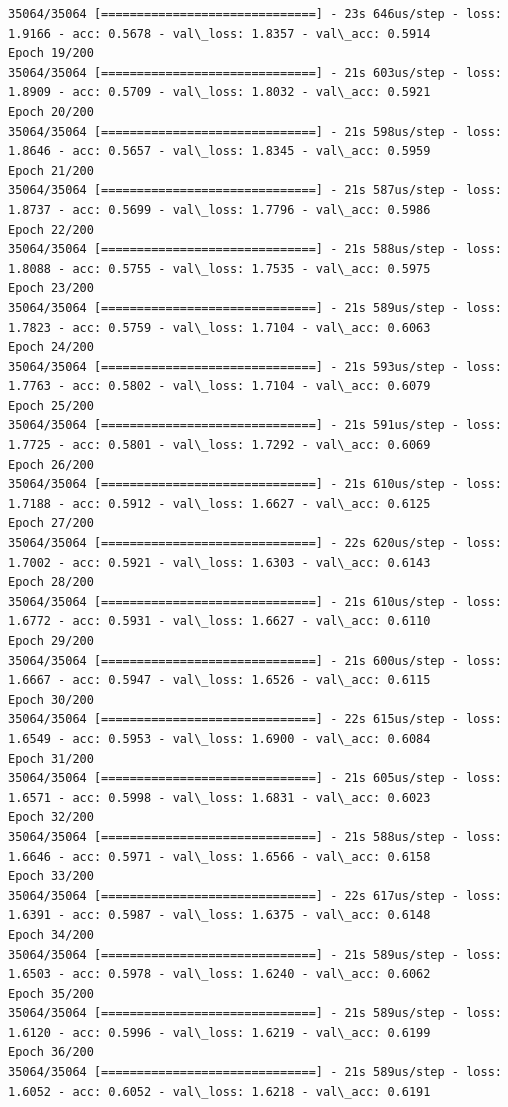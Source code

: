 \documentclass[11pt]{article}
\begin{document}
\begin{Verbatim}[commandchars=\\\{\}]
35064/35064 [==============================] - 23s 646us/step - loss: 1.9166 - acc: 0.5678 - val\_loss: 1.8357 - val\_acc: 0.5914
Epoch 19/200
35064/35064 [==============================] - 21s 603us/step - loss: 1.8909 - acc: 0.5709 - val\_loss: 1.8032 - val\_acc: 0.5921
Epoch 20/200
35064/35064 [==============================] - 21s 598us/step - loss: 1.8646 - acc: 0.5657 - val\_loss: 1.8345 - val\_acc: 0.5959
Epoch 21/200
35064/35064 [==============================] - 21s 587us/step - loss: 1.8737 - acc: 0.5699 - val\_loss: 1.7796 - val\_acc: 0.5986
Epoch 22/200
35064/35064 [==============================] - 21s 588us/step - loss: 1.8088 - acc: 0.5755 - val\_loss: 1.7535 - val\_acc: 0.5975
Epoch 23/200
35064/35064 [==============================] - 21s 589us/step - loss: 1.7823 - acc: 0.5759 - val\_loss: 1.7104 - val\_acc: 0.6063
Epoch 24/200
35064/35064 [==============================] - 21s 593us/step - loss: 1.7763 - acc: 0.5802 - val\_loss: 1.7104 - val\_acc: 0.6079
Epoch 25/200
35064/35064 [==============================] - 21s 591us/step - loss: 1.7725 - acc: 0.5801 - val\_loss: 1.7292 - val\_acc: 0.6069
Epoch 26/200
35064/35064 [==============================] - 21s 610us/step - loss: 1.7188 - acc: 0.5912 - val\_loss: 1.6627 - val\_acc: 0.6125
Epoch 27/200
35064/35064 [==============================] - 22s 620us/step - loss: 1.7002 - acc: 0.5921 - val\_loss: 1.6303 - val\_acc: 0.6143
Epoch 28/200
35064/35064 [==============================] - 21s 610us/step - loss: 1.6772 - acc: 0.5931 - val\_loss: 1.6627 - val\_acc: 0.6110
Epoch 29/200
35064/35064 [==============================] - 21s 600us/step - loss: 1.6667 - acc: 0.5947 - val\_loss: 1.6526 - val\_acc: 0.6115
Epoch 30/200
35064/35064 [==============================] - 22s 615us/step - loss: 1.6549 - acc: 0.5953 - val\_loss: 1.6900 - val\_acc: 0.6084
Epoch 31/200
35064/35064 [==============================] - 21s 605us/step - loss: 1.6571 - acc: 0.5998 - val\_loss: 1.6831 - val\_acc: 0.6023
Epoch 32/200
35064/35064 [==============================] - 21s 588us/step - loss: 1.6646 - acc: 0.5971 - val\_loss: 1.6566 - val\_acc: 0.6158
Epoch 33/200
35064/35064 [==============================] - 22s 617us/step - loss: 1.6391 - acc: 0.5987 - val\_loss: 1.6375 - val\_acc: 0.6148
Epoch 34/200
35064/35064 [==============================] - 21s 589us/step - loss: 1.6503 - acc: 0.5978 - val\_loss: 1.6240 - val\_acc: 0.6062
Epoch 35/200
35064/35064 [==============================] - 21s 589us/step - loss: 1.6120 - acc: 0.5996 - val\_loss: 1.6219 - val\_acc: 0.6199
Epoch 36/200
35064/35064 [==============================] - 21s 589us/step - loss: 1.6052 - acc: 0.6052 - val\_loss: 1.6218 - val\_acc: 0.6191

\end{Verbatim}
\end{document}
